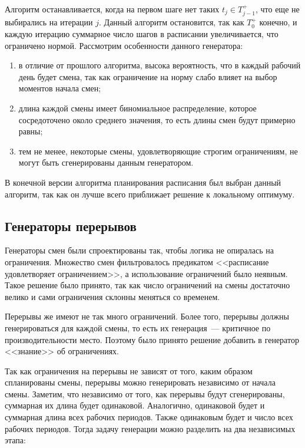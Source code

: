 \documentclass[times,specification,annotation]{itmo-student-thesis}
\begin{document}
Алгоритм останавливается, когда на первом шаге нет таких $t_j \in T^+_{j - 1}$, что еще не выбирались на итерации $j$.
Данный алгоритм остановится, так как $T^+_0$ конечно, и каждую итерацию суммарное число шагов в расписании увеличивается, что ограничено нормой.
Рассмотрим особенности данного генератора:

\begin{enumerate}
    \item в отличие от прошлого алгоритма, высока вероятность, что в каждый рабочий день будет смена, так как ограничение на норму слабо влияет на выбор моментов начала смен;
    \item длина каждой смены имеет биномиальное распределение, которое сосредоточено около среднего значения, то есть длины смен будут примерно равны;
    \item тем не менее, некоторые смены, удовлетворяющие строгим ограничениям, не могут быть сгенерированы данным генератором.
\end{enumerate}

В конечной версии алгоритма планирования расписания был выбран данный алгоритм, так как он лучше всего приближает решение к локальному оптимуму.

\subsection{Генераторы перерывов}

Генераторы смен были спроектированы так, чтобы логика не опиралась на ограничения.
Множество смен фильтровалось предикатом <<расписание удовлетворяет ограничением>>, а использование ограничений было неявным.
Такое решение было принято, так как число ограничений на смены достаточно велико и сами ограничения склонны меняться со временем.

Перерывы же имеют не так много ограничений.
Более того, перерывы должны генерироваться для каждой смены, то есть их генерация~--- критичное по производительности место.
Поэтому было принято решение добавить в генератор <<знание>> об ограничениях.

Так как ограничения на перерывы не зависят от того, каким образом спланированы смены, перерывы можно генерировать независимо от начала смены.
Заметим, что независимо от того, как перерывы будут сгенерированы, суммарная их длина будет одинаковой.
Аналогично, одинаковой будет и суммарная длина всех рабочих периодов.
Также одинаковым будет и число всех рабочих периодов.
Тогда задачу генерации можно разделить на два независимых этапа:
\end{document}
